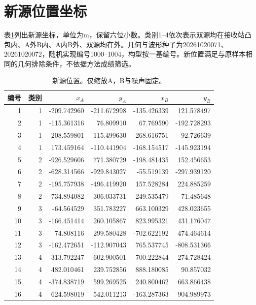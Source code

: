 \documentclass[a4paper,fleqn]{cas-sc}
\begin{document}
\section{新源位置坐标}\label{en:coordinates}
表\ref{en:coordinates-table}列出新源坐标，单位为m，保留六位小数。类别1--4依次表示双源均在接收站凸包内、A外B内、A内B外、双源均在外。几何与波形种子为20261020071、20261020072，随机实现编号1000--1004，构型按一基编号。新位置满足与原样本相同的几何排除条件，不依据方法成绩筛选。
\begin{table}[pos=H]\centering
\caption{新源位置。仅缩放A，B与噪声固定。}\label{en:coordinates-table}
\begin{tabular}{@{}rrrrrr@{}}\toprule
编号 & 类别 & $x_A$ & $y_A$ & $x_B$ & $y_B$\\\midrule
1 & 1 & -209.742960 & -211.672998 & -135.426339 & 121.578497\\
2 & 1 & -115.361316 & 76.809910 & 67.769590 & -192.728293\\
3 & 1 & -208.559801 & 115.499630 & 268.616751 & -92.726639\\
4 & 1 & 173.459164 & -110.441904 & -168.154517 & -145.923194\\
5 & 2 & -926.529606 & 771.380729 & -198.481435 & 152.456653\\
6 & 2 & -628.314566 & -929.843027 & -55.519139 & -297.939120\\
7 & 2 & -195.757938 & -496.419920 & 157.528284 & 224.885259\\
8 & 2 & -734.894082 & -306.033731 & -249.535479 & 71.485648\\
9 & 3 & -64.564529 & 351.783227 & 663.100329 & 428.023655\\
10 & 3 & -166.451414 & 260.105867 & 823.995321 & 431.176047\\
11 & 3 & 74.808116 & 299.580428 & -702.622192 & 474.464614\\
12 & 3 & -162.472651 & -112.907043 & 765.537745 & -808.531366\\
13 & 4 & 313.792247 & 602.900501 & 700.222844 & -274.728424\\
14 & 4 & 482.010461 & 239.752856 & 888.180085 & 90.857032\\
15 & 4 & -374.838719 & 599.269525 & 240.800462 & 663.866438\\
16 & 4 & 624.598019 & 542.011213 & -163.287363 & 904.989973\\\bottomrule
\end{tabular}\end{table}
\FloatBarrier


\end{document}
